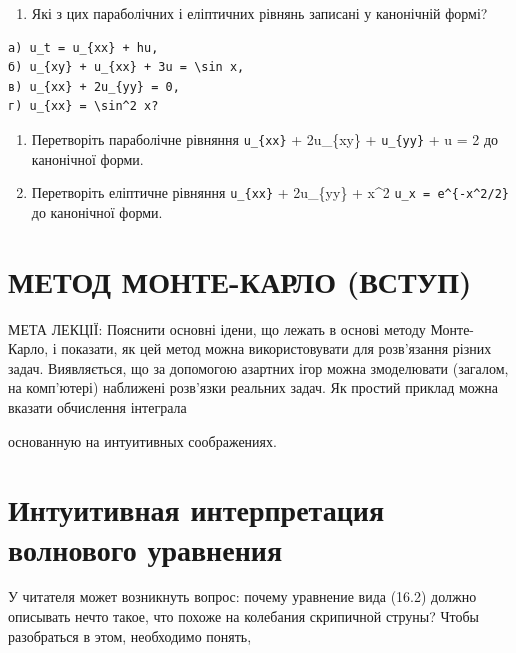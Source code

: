 \documentclass[
  ukrainian,
]{article}
\providecommand{\tightlist}{%
  \setlength{\itemsep}{0pt}\setlength{\parskip}{0pt}}
\begin{document}
\begin{enumerate}
\def\labelenumi{\arabic{enumi}.}
\tightlist
\item
  Які з цих параболічних і еліптичних рівнянь записані у канонічній
  формі?
\end{enumerate}

\begin{verbatim}
a) u_t = u_{xx} + hu,
б) u_{xy} + u_{xx} + 3u = \sin x,
в) u_{xx} + 2u_{yy} = 0,
г) u_{xx} = \sin^2 x?
\end{verbatim}

\begin{enumerate}
\def\labelenumi{\arabic{enumi}.}
\setcounter{enumi}{1}
\item
  Перетворіть параболічне рівняння \texttt{u\_\{xx\}} + 2u\_\{xy\} +
  \texttt{u\_\{yy\}} + u = 2 до канонічної форми.
\item
  Перетворіть еліптичне рівняння \texttt{u\_\{xx\}} + 2u\_\{yy\} +
  x\^{}2 \texttt{u\_x\ =\ e\^{}\{-x\^{}2/2\}}до канонічної форми.
\end{enumerate}

\section{МЕТОД МОНТЕ-КАРЛО
(ВСТУП)}\label{ux43cux435ux442ux43eux434-ux43cux43eux43dux442ux435-ux43aux430ux440ux43bux43e-ux432ux441ux442ux443ux43f}

МЕТА ЛЕКЦІЇ: Пояснити основні ідени, що лежать в основі методу
Монте-Карло, і показати, як цей метод можна використовувати для
розв'язання різних задач. Виявляється, що за допомогою азартних ігор
можна змоделювати (загалом, на комп'ютері) наближені розв'язки реальних
задач. Як простий приклад можна вказати обчислення інтеграла

основанную на интуитивных соображениях.

\section{Интуитивная интерпретация волнового
уравнения}\label{ux438ux43dux442ux443ux438ux442ux438ux432ux43dux430ux44f-ux438ux43dux442ux435ux440ux43fux440ux435ux442ux430ux446ux438ux44f-ux432ux43eux43bux43dux43eux432ux43eux433ux43e-ux443ux440ux430ux432ux43dux435ux43dux438ux44f}

У читателя может возникнуть вопрос: почему уравнение вида (16.2) должно
описывать нечто такое, что похоже на колебания скрипичной струны? Чтобы
разобраться в этом, необходимо понять,
\end{document}
